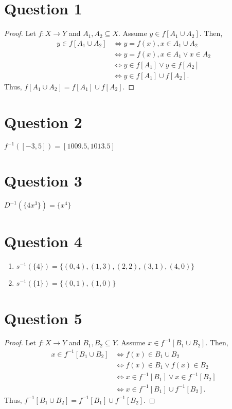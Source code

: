 \documentclass{article}
\begin{document}
\section*{Question 1}
\begin{proof}
    Let $f: X \to Y$ and $A_1, A_2 \subseteq X$.
    Assume $y \in f[A_1 \cup A_2]$.
    Then,
    \begin{align*}
        y \in f[A_1 \cup A_2] &\iff y = f(x), x \in A_1 \cup A_2 \\
        &\iff y = f(x), x \in A_1 \lor x \in A_2 \\
        &\iff y \in f[A_1] \lor y \in f[A_2] \\
        &\iff y \in f[A_1] \cup f[A_2].
    \end{align*}
    Thus, $f[A_1 \cup A_2] = f[A_1] \cup f[A_2]$.
\end{proof}

\section*{Question 2}
$f^{-1}([-3, 5]) = [1009.5, 1013.5]$

\section*{Question 3}
$D^{-1}(\{4x^3\}) = \{x^4\}$

\section*{Question 4}
\begin{enumerate}
    \item $s^{-1}(\{4\}) = \{(0, 4), (1, 3), (2, 2), (3, 1), (4, 0)\}$
    \item $s^{-1}(\{1\}) = \{(0, 1), (1, 0)\}$
\end{enumerate}

\section*{Question 5}
\begin{proof}
    Let $f: X \to Y$ and $B_1, B_2 \subseteq Y$.
    Assume $x \in f^{-1}[B_1 \cup B_2]$.
    Then,
    \begin{align*}
        x \in f^{-1}[B_1 \cup B_2] &\iff f(x) \in B_1 \cup B_2 \\
        &\iff f(x) \in B_1 \lor f(x) \in B_2 \\
        &\iff x \in f^{-1}[B_1] \lor x \in f^{-1}[B_2] \\
        &\iff x \in f^{-1}[B_1] \cup f^{-1}[B_2].
    \end{align*}
    Thus, $f^{-1}[B_1 \cup B_2] = f^{-1}[B_1] \cup f^{-1}[B_2]$.
\end{proof}
\end{document}
